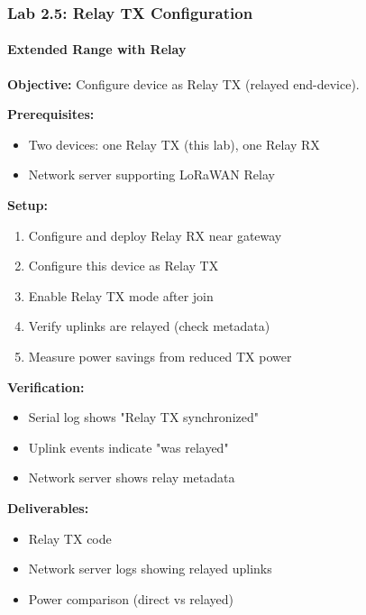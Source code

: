 \documentclass{beamer}
\begin{document}
\begin{frame}
\frametitle{Lab 2.5: Relay TX Configuration}
\framesubtitle{Extended Range with Relay}

\textbf{Objective:} Configure device as Relay TX (relayed end-device).

\textbf{Prerequisites:}
\begin{itemize}
    \item Two devices: one Relay TX (this lab), one Relay RX
    \item Network server supporting LoRaWAN Relay
\end{itemize}

\textbf{Setup:}
\begin{enumerate}
    \item Configure and deploy Relay RX near gateway
    \item Configure this device as Relay TX
    \item Enable Relay TX mode after join
    \item Verify uplinks are relayed (check metadata)
    \item Measure power savings from reduced TX power
\end{enumerate}

\textbf{Verification:}
\begin{itemize}
    \item Serial log shows "Relay TX synchronized"
    \item Uplink events indicate "was relayed"
    \item Network server shows relay metadata
\end{itemize}

\textbf{Deliverables:}
\begin{itemize}
    \item Relay TX code
    \item Network server logs showing relayed uplinks
    \item Power comparison (direct vs relayed)
\end{itemize}
\end{frame}
\end{document}
